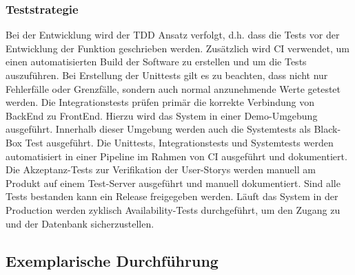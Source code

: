 \subsubsection*{Teststrategie}
Bei der Entwicklung wird der \ac{TDD} Ansatz verfolgt, d.h. dass die Tests vor der Entwicklung der Funktion geschrieben werden.
Zusätzlich wird \ac{CI} verwendet, um einen automatisierten Build der Software zu erstellen und um die Tests auszuführen.
Bei Erstellung der Unittests gilt es zu beachten, dass nicht nur Fehlerfälle oder Grenzfälle, sondern auch normal anzunehmende Werte getestet werden.
Die Integrationstests prüfen primär die korrekte Verbindung von BackEnd zu FrontEnd.
Hierzu wird das System in einer Demo-Umgebung ausgeführt.
Innerhalb dieser Umgebung werden auch die Systemtests als Black-Box Test ausgeführt.
\newparagraph
Die Unittests, Integrationstests und Systemtests werden automatisiert in einer Pipeline im Rahmen von \ac{CI} ausgeführt und dokumentiert.
Die Akzeptanz-Tests zur Verifikation der User-Storys werden manuell am Produkt auf einem Test-Server ausgeführt und manuell dokumentiert. 
Sind alle Tests bestanden kann ein Release freigegeben werden.
Läuft das System in der Production werden zyklisch Availability-Tests durchgeführt, um den Zugang zu  und der Datenbank sicherzustellen.
\subsection{Exemplarische Durchführung}